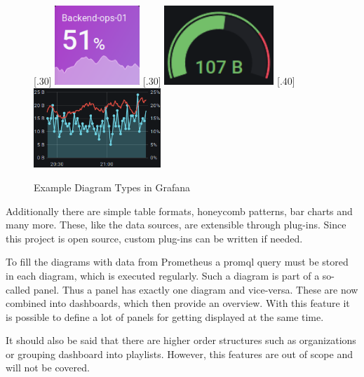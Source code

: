 \begin{figure}[!ht]
	[.30\textwidth]{%
		\centering
		\includegraphics[height=3cm]{assets/screenshots/Screenshot_2020-12-08 1 - New Features in v7 0 - Grafana.png}
	}%
	[.30\textwidth]{%
		\centering
		\includegraphics[height=3cm]{assets/screenshots/Screenshot_2020-12-08 Website trends - Grafana.png}
	}%
	[.40\textwidth]{%
		\centering
		\includegraphics[height=3cm]{assets/screenshots/Screenshot_2020-12-08 Grafana Play Home - Grafana(2).png}
	}%
	\caption{Example Diagram Types in Grafana}
	\label{fig:example_grafana_graph}
\end{figure}

Additionally there are simple table formats, honeycomb patterns, bar charts and many more. These, like the data sources, are extensible through plug-ins. Since this project is open source, custom plug-ins can be written if needed.

To fill the diagrams with data from Prometheus a \gls{promql} query must be stored in each diagram, which is executed regularly. Such a diagram is part of a so-called panel. Thus a panel has exactly one diagram and vice-versa. These are now combined into dashboards, which then provide an overview. With this feature it is possible to define a lot of panels for getting displayed at the same time.

It should also be said that there are higher order structures such as organizations or grouping dashboard into playlists. However, this features are out of scope and will not be covered.

